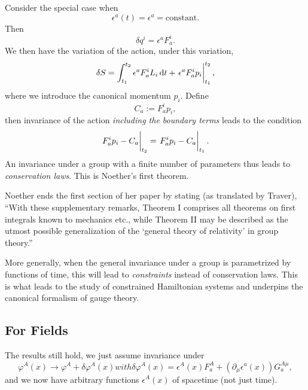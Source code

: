 Consider the special case when
\begin{equation}
\epsilon^{a}(t) = \epsilon^{a} = \mbox{constant}.
\end{equation}
Then
\begin{equation}
\delta q^{i} = \epsilon^{a}F^{i}_{a}.
\end{equation}
We then have the variation of the action, under this variation,
\begin{equation}
\delta\action = \int^{t_{2}}_{t_{1}}\epsilon^{a}F^{i}_{a}L_{i}\,\D t + \left.\vphantom{\frac{1}{1}}\epsilon^{a}F^{i}_{a}p_{i}\right|^{t_{2}}_{t_{1}},
\end{equation}
where we introduce the canonical momentum $p_{i}$. Define
\begin{equation}
C_{a} := F^{i}_{a}p_{i},
\end{equation}
then invariance of the action \emph{including the boundary terms}
leads to the condition
\begin{equation}
\left.\vphantom{\frac{1}{1}}F^{i}_{a}p_{i}-C_{a}\right|_{t_{2}}
=
\left.\vphantom{\frac{1}{1}}F^{i}_{a}p_{i}-C_{a}\right|_{t_{1}}.
\end{equation}
An invariance under a group with a finite number of parameters thus
leads to \emph{conservation laws}. This is Noether's first theorem.

\begin{remark}
Noether ends the first section of her paper by stating (as translated by
Traver), ``With these supplementary remarks, Theorem I comprises all
theorems on first integrals known to mechanics etc., while Theorem II
may be described as the utmost possible generalization of the `general
theory of relativity' in group theory.''
\end{remark}

\begin{remark}
More generally, when the general invariance under a group is
parametrized by functions of time, this will lead to \emph{constraints}
instead of conservation laws. This is what leads to the study of
constrained Hamiltonian systems and underpins the canonical formalism of
gauge theory.
\end{remark}

\subsection{For Fields}

\M
The results still hold, we just assume invariance under
\begin{subequations}
\begin{equation}
\varphi^{A}(x)\to\varphi^{A}+\delta\varphi^{A}(x)
\end{equation}
with
\begin{equation}
\delta\varphi^{A}(x) = \epsilon^{A}(x)F^{A}_{a} + (\partial_{\mu}\epsilon^{a}(x))G^{A\mu}_{a},
\end{equation}
\end{subequations}
and we now have arbitrary functions $\epsilon^{A}(x)$ of spacetime (not
just time).

